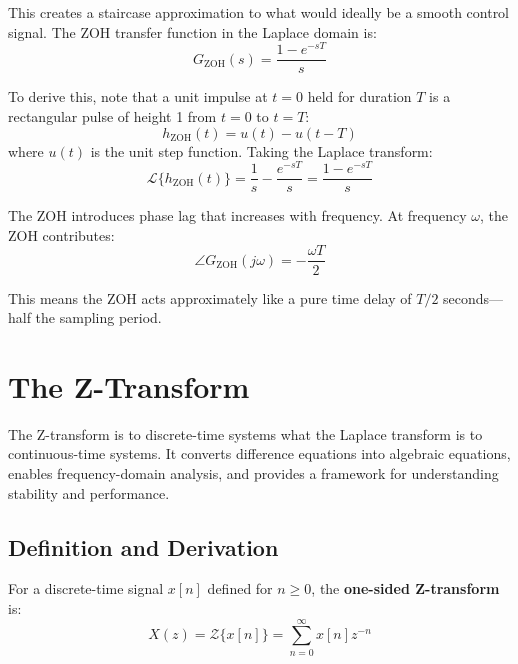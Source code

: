 This creates a staircase approximation to what would ideally be a smooth control signal. The ZOH transfer function in the Laplace domain is:
\begin{equation}
G_{\text{ZOH}}(s) = \frac{1 - e^{-sT}}{s}
\label{eq:zoh_transfer}
\end{equation}

To derive this, note that a unit impulse at $t = 0$ held for duration $T$ is a rectangular pulse of height 1 from $t = 0$ to $t = T$:
\begin{equation}
h_{\text{ZOH}}(t) = u(t) - u(t-T)
\end{equation}
where $u(t)$ is the unit step function. Taking the Laplace transform:
\begin{equation}
\mathcal{L}\{h_{\text{ZOH}}(t)\} = \frac{1}{s} - \frac{e^{-sT}}{s} = \frac{1 - e^{-sT}}{s}
\end{equation}

The ZOH introduces phase lag that increases with frequency. At frequency $\omega$, the ZOH contributes:
\begin{equation}
\angle G_{\text{ZOH}}(j\omega) = -\frac{\omega T}{2}
\end{equation}

This means the ZOH acts approximately like a pure time delay of $T/2$ seconds---half the sampling period.

\section{The Z-Transform}
\label{sec:z_transform}

The Z-transform is to discrete-time systems what the Laplace transform is to continuous-time systems. It converts difference equations into algebraic equations, enables frequency-domain analysis, and provides a framework for understanding stability and performance.

\subsection{Definition and Derivation}

For a discrete-time signal $x[n]$ defined for $n \geq 0$, the \textbf{one-sided Z-transform} is:
\begin{equation}
\boxed{X(z) = \mathcal{Z}\{x[n]\} = \sum_{n=0}^{\infty} x[n] z^{-n}}
\label{eq:z_transform_def}
\end{equation}

